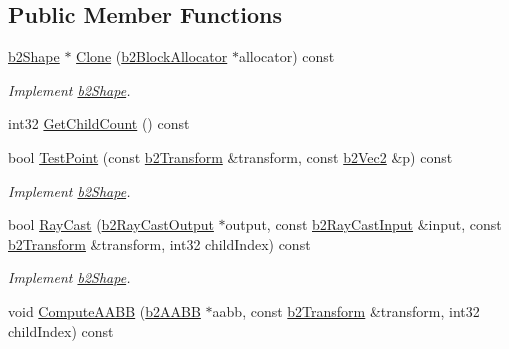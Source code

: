 \subsection*{Public Member Functions}
\begin{DoxyCompactItemize}
\item 
\mbox{\label{classb2CircleShape_ae3742d48e89fe1234d02fe98b48d9f6d}} 
\hyperlink{classb2Shape}{b2\+Shape} $\ast$ \hyperlink{classb2CircleShape_ae3742d48e89fe1234d02fe98b48d9f6d}{Clone} (\hyperlink{classb2BlockAllocator}{b2\+Block\+Allocator} $\ast$allocator) const
\begin{DoxyCompactList}\small\item\em Implement \hyperlink{classb2Shape}{b2\+Shape}. \end{DoxyCompactList}\item 
int32 \hyperlink{classb2CircleShape_a750636bbf5ef7bd1bb4fd5e82be65d19}{Get\+Child\+Count} () const
\item 
\mbox{\label{classb2CircleShape_a764b0ec9fbd65c9ea091672a25eefcf7}} 
bool \hyperlink{classb2CircleShape_a764b0ec9fbd65c9ea091672a25eefcf7}{Test\+Point} (const \hyperlink{structb2Transform}{b2\+Transform} \&transform, const \hyperlink{structb2Vec2}{b2\+Vec2} \&p) const
\begin{DoxyCompactList}\small\item\em Implement \hyperlink{classb2Shape}{b2\+Shape}. \end{DoxyCompactList}\item 
\mbox{\label{classb2CircleShape_a98a15bf916dcbc496fe6b00bf1f08859}} 
bool \hyperlink{classb2CircleShape_a98a15bf916dcbc496fe6b00bf1f08859}{Ray\+Cast} (\hyperlink{structb2RayCastOutput}{b2\+Ray\+Cast\+Output} $\ast$output, const \hyperlink{structb2RayCastInput}{b2\+Ray\+Cast\+Input} \&input, const \hyperlink{structb2Transform}{b2\+Transform} \&transform, int32 child\+Index) const
\begin{DoxyCompactList}\small\item\em Implement \hyperlink{classb2Shape}{b2\+Shape}. \end{DoxyCompactList}\item 
void \hyperlink{classb2CircleShape_a03fdda20d946ec0e5fd00cfd5728f7aa}{Compute\+A\+A\+BB} (\hyperlink{structb2AABB}{b2\+A\+A\+BB} $\ast$aabb, const \hyperlink{structb2Transform}{b2\+Transform} \&transform, int32 child\+Index) const

\end{DoxyCompactItemize}
